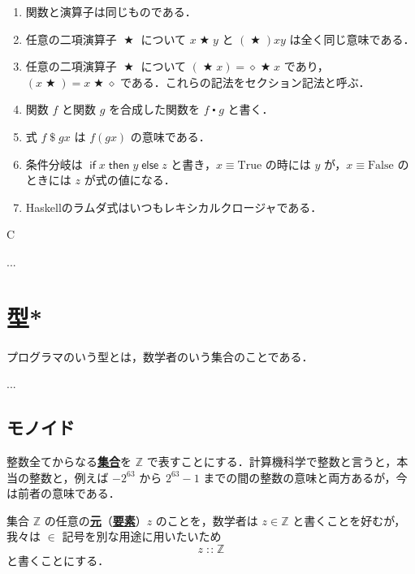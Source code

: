 \documentclass[a4paper,twocolumn]{jsbook}
\newcommand{\programminglanguage}[1]{\textsf{#1}}
\newcommand{\haskell}{\programminglanguage{Haskell}}
\newenvironment{leader}{\begingroup\gt}{\endgroup}
\newenvironment{note}[1]{\begin{boxnote}\begin{center}#1\end{center}}{\end{boxnote}}
\newcommand{\keyword}[1]{{\underline{\textbf{#1}}}}
\newcommand{\mKeyword}[1]{\mathsf{#1}} %
\newcommand{\mIfKeyword}{\mKeyword{if}}
\newcommand{\mElseKeyword}{\mKeyword{else}}
\newcommand{\mThenKeyword}{\mKeyword{then}}
\DeclareMathOperator{\mElse}{\mElseKeyword}
\DeclareMathOperator{\mIf}{\mIfKeyword}
\DeclareMathOperator{\mThen}{\mThenKeyword}
\newcommand{\mSpecialConst}[1]{\mathrm{#1}} %
\newcommand{\mFalse}{\mSpecialConst{False}}
\newcommand{\mTrue}{\mSpecialConst{True}}
\newcommand{\mAnonParam}{\diamond}
\DeclareMathOperator{\mApply}{\$}
\DeclareMathOperator{\mBinOp}{\bigstar}
\DeclareMathOperator{\mComp}{\centerdot}
\DeclareMathOperator{\mIn}{{:\!:}}
\newcommand{\mSpecialSet}[1]{\mathbb{#1}} %
\newcommand{\mZSet}{\mSpecialSet{Z}}
\newcommand{\mIfThenElse}[3]{\mIf{#1}\mThen{#2}\mElse{#3}}
\begin{document}
\begin{enumerate}
\item 関数と演算子は同じものである．
\item 任意の二項演算子 $\mBinOp$ について $x\mBinOp y$ と $(\mBinOp)xy$ は全く同じ意味である．
\item 任意の二項演算子 $\mBinOp$ について $(\mBinOp x)=\mAnonParam\mBinOp x$ であり，$(x\mBinOp)=x\mBinOp\mAnonParam$ である．これらの記法をセクション記法と呼ぶ． 
\item 関数 $f$ と関数 $g$ を合成した関数を $f\mComp g$ と書く．
\item 式 $f\mApply gx$ は $f(gx)$ の意味である．
\item 条件分岐は $\mIfThenElse{x}{y}{z}$ と書き，$x\equiv\mTrue$ の時には $y$ が，$x\equiv\mFalse$ のときには $z$ が式の値になる．
\item \haskell のラムダ式はいつもレキシカルクロージャである．
\end{enumerate}

\begin{note}{C}
...
\end{note}


\chapter{型*}

\begin{leader}
プログラマのいう型とは，数学者のいう集合のことである．

...
\end{leader}

\section{モノイド}

整数全てからなる\keyword{集合}を $\mZSet$ で表すことにする．計算機科学で整数と言うと，本当の整数と，例えば $-2^{63}$ から $2^{63}-1$ までの間の整数の意味と両方あるが，今は前者の意味である．

集合 $\mZSet$ の任意の\keyword{元}（\keyword{要素}）$z$ のことを，数学者は $z\in\mZSet$ と書くことを好むが，我々は $\in$ 記号を別な用途に用いたいため
\begin{equation}
\label{eq:totality}
z\mIn\mZSet
\end{equation}
と書くことにする．
\end{document}
